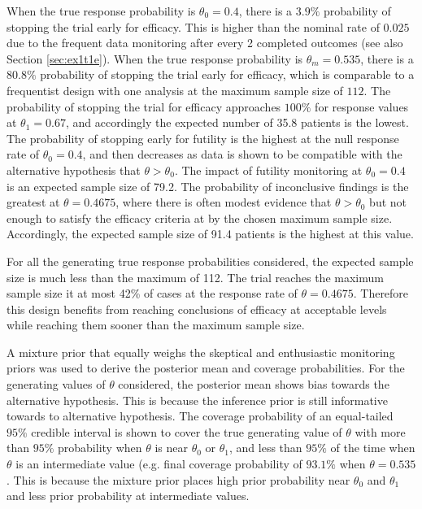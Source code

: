 \documentclass[useAMS,usenatbib,referee]{biom}
\begin{document}
When the true response probability is $\theta_0=0.4$, there is a $3.9\%$ probability of stopping the trial early for efficacy. This is higher than the nominal rate of $0.025$ due to the frequent data monitoring after every 2 completed outcomes (see also Section \ref{sec:ex1t1e}). When the true response probability is $\theta_m=0.535$, there is a $80.8\%$ probability of stopping the trial early for efficacy, which is comparable to a frequentist design with one analysis at the maximum sample size of $112$. The probability of stopping the trial for efficacy approaches $100\%$ for response values at $\theta_1=0.67$, and accordingly the expected number of 35.8 patients is the lowest.
%
The probability of stopping early for futility is the highest at the null response rate of $\theta_0=0.4$, and then decreases as data is shown to be compatible with the alternative hypothesis that $\theta>\theta_0$. The impact of futility monitoring at $\theta_0=0.4$ is an expected sample size of 79.2.
%
The probability of inconclusive findings is the greatest at $\theta=0.4675$, where there is often modest evidence that $\theta>\theta_0$ but not enough to satisfy the efficacy criteria at by the chosen maximum sample size. Accordingly, the expected sample size of 91.4 patients is the highest at this value.

For all the generating true response probabilities considered, the expected sample size is much less than the maximum of 112. The trial reaches the maximum sample size it at most 42\% of cases at the response rate of $\theta=0.4675$. Therefore this design benefits from reaching conclusions of efficacy at acceptable levels while reaching them sooner than the maximum sample size.

A mixture prior that equally weighs the skeptical and enthusiastic monitoring priors was used to derive the posterior mean and coverage probabilities. For the generating values of $\theta$ considered, the posterior mean shows bias towards the alternative hypothesis. This is because the inference prior is still informative towards to alternative hypothesis. The coverage probability of an equal-tailed $95\%$ credible interval is shown to cover the true generating value of $\theta$ with more than $95\%$ probability when $\theta$ is near $\theta_0$ or $\theta_1$, and less than $95\%$ of the time when $\theta$ is an intermediate value (e.g. final coverage probability of $93.1\%$ when $\theta=0.535$. This is because the mixture prior places high prior probability near $\theta_0$ and $\theta_1$ and less prior probability at intermediate values.
\end{document}
